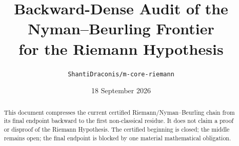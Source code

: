 \documentclass[11pt]{article}
\title{Backward-Dense Audit of the Nyman--Beurling Frontier\\for the Riemann Hypothesis}
\author{\texttt{ShantiDraconis/m-core-riemann}}
\date{18 September 2026}
\begin{document}
\maketitle
\begin{abstract}
This document compresses the current certified Riemann/Nyman--Beurling chain
from its final endpoint backward to the first non-classical residue. It does
not claim a proof or disproof of the Riemann Hypothesis. The certified
beginning is closed; the middle remains open; the final endpoint is blocked
by one material mathematical obligation.
\end{abstract}







\end{document}

